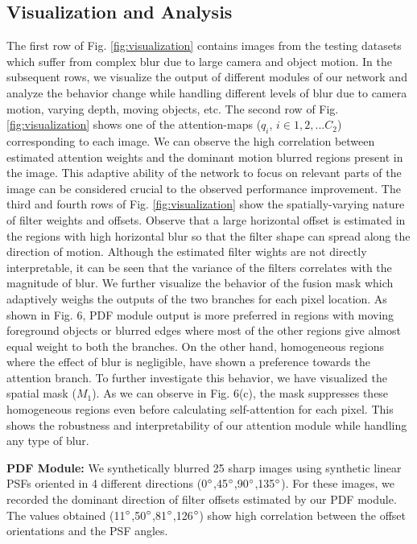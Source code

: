 \documentclass[10pt,twocolumn,letterpaper]{article}
\begin{document}
\subsection{Visualization and Analysis}
The first row of Fig. \ref{fig:visualization} contains images from the testing datasets which suffer from complex blur due to large camera and object motion. In the subsequent rows, we visualize the output of different modules of our network and analyze the behavior change while handling different levels of blur due to camera motion, varying depth, moving objects, etc. The second row of Fig. \ref{fig:visualization} shows one of the attention-maps ($q_i$, $i \in {1,2,...C_2}$) corresponding to each image. We can observe the high correlation between estimated attention weights and the dominant motion blurred regions present in the image. This adaptive ability of the network to focus on relevant parts of the image can be considered crucial to the observed performance improvement. The third and fourth rows of Fig. \ref{fig:visualization} show the spatially-varying nature of filter weights and offsets. Observe that a large horizontal offset is estimated in the regions with high horizontal blur so that the filter shape can spread along the direction of motion. Although the estimated filter wights are not directly interpretable, it can be seen that the variance of the filters correlates with the magnitude of blur. We further visualize the behavior of the fusion mask which adaptively weighs the outputs of the two branches for each pixel location. As shown in Fig. 6, PDF module output is more preferred in regions with moving foreground objects or blurred edges where most of the other regions give almost equal weight to both the branches. On the other hand, homogeneous regions where the effect of blur is negligible, have shown a preference towards the attention branch. To further investigate this behavior, we have visualized the spatial mask ($M_1$). As we can observe in Fig. 6(c), the mask suppresses these homogeneous regions even before calculating self-attention for each pixel. This shows the robustness and interpretability of our attention module while handling any type of blur.

\noindent \textbf{PDF Module:} We synthetically blurred 25 sharp images using synthetic linear PSFs oriented in 4 different directions (0$\degree$,45$\degree$,90$\degree$,135$\degree$). For these images, we recorded the dominant direction of filter offsets estimated by our PDF module. The values obtained (11$\degree$,50$\degree$,81$\degree$,126$\degree$) show high correlation between the offset orientations and the PSF angles.
\end{document}
